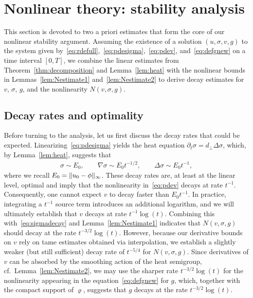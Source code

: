 \documentclass[12pt,oneside,a4paper,reqno]{amsart}
\numberwithin{equation}{section}
\theoremstyle{definition}
\theoremstyle{remark}
\DeclarePairedDelimiter{\norm}{\lVert}{\rVert}
\begin{document}
\section{Nonlinear theory: stability analysis}
\label{sec:nonlinearstab}

This section is devoted to two a priori estimates that form the core of our nonlinear stability argument. 
Assuming the existence of a solution $(u,\sigma,v,g)$ to the system given by~\eqref{eq:rdefull},~\eqref{eq:pdesigma},~\eqref{eq:pdev}, and~\eqref{eq:defgnew} on a time interval $[0,T]$, we combine the linear estimates from Theorem~\ref{thm:decomposition} and Lemma~\ref{lem:heat} with the nonlinear bounds in Lemmas~\ref{lem:Nestimate1} and~\ref{lem:Nestimate2} to derive decay estimates for $v$, $\sigma$, $g$, and the nonlinearity $N(v,\sigma,g)$. 

\subsection{Decay rates and optimality} \label{subsec:expect_decay}

Before turning to the analysis, let us first discuss the decay rates that could be expected. 
Linearizing~\eqref{eq:pdesigma} yields the heat equation $\partial_t \sigma = d_\bot \Delta \sigma$, which, by Lemma~\ref{lem:heat}, suggests that \begin{align} \label{eq:sigmadecay}
	\sigma \sim E_0, \qquad \nabla \sigma \sim E_0 t^{-1/2}, \qquad \Delta \sigma \sim E_0 t^{-1},
\end{align}
where we recall $E_0 = \norm{u_0 - \phi}_\infty$. 
These decay rates are, at least at the linear level, optimal and imply that the nonlinearity in~\eqref{eq:pdev} decays at rate $t^{-1}$. 
Consequently, one cannot expect $v$ to decay faster than $E_0 t^{-1}$. 
In practice, integrating a $t^{-1}$ source term introduces an additional logarithm, and we will ultimately establish that $v$ decays at rate $t^{-1}\log(t)$. 
Combining this with~\eqref{eq:sigmadecay} and Lemma~\ref{lem:Nestimate1} indicates that $N(v,\sigma,g)$ should decay at the rate $t^{-3/2}\log(t)$. 
However, because our derivative bounds on $v$ rely on tame estimates obtained via interpolation, we establish a slightly weaker (but still sufficient) decay rate of $t^{-5/4}$ for $N(v,\sigma,g)$. Since derivatives of $v$ can be absorbed by the smoothing action of the heat semigroup, cf.~Lemma~\ref{lem:Nestimate2}, we may use the sharper rate $t^{-3/2}\log(t)$ for the nonlinearity appearing in the equation~\eqref{eq:defgnew} for $g$, which, together with the compact support of $\varrho$, suggests that $g$ decays at the rate $t^{-3/2}\log(t)$.
\end{document}
